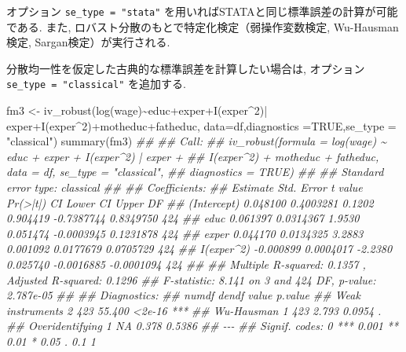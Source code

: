 \documentclass[
  letterpaper,
  xelatex,
  ja=standard, xelatex]{bxjsbook}
\newenvironment{Shaded}{\begin{snugshade}}{\end{snugshade}}
\newcommand{\AttributeTok}[1]{\textcolor[rgb]{0.40,0.45,0.13}{#1}}
\newcommand{\ConstantTok}[1]{\textcolor[rgb]{0.56,0.35,0.01}{#1}}
\newcommand{\DecValTok}[1]{\textcolor[rgb]{0.68,0.00,0.00}{#1}}
\newcommand{\DocumentationTok}[1]{\textcolor[rgb]{0.37,0.37,0.37}{\textit{#1}}}
\newcommand{\FunctionTok}[1]{\textcolor[rgb]{0.28,0.35,0.67}{#1}}
\newcommand{\NormalTok}[1]{\textcolor[rgb]{0.00,0.23,0.31}{#1}}
\newcommand{\OtherTok}[1]{\textcolor[rgb]{0.00,0.23,0.31}{#1}}
\newcommand{\SpecialCharTok}[1]{\textcolor[rgb]{0.37,0.37,0.37}{#1}}
\newcommand{\StringTok}[1]{\textcolor[rgb]{0.13,0.47,0.30}{#1}}
\begin{document}
オプション \texttt{se\_type\ =\ "stata"}
を用いればSTATAと同じ標準誤差の計算が可能である. また,
ロバスト分散のもとで特定化検定（弱操作変数検定, Wu-Hausman検定,
Sargan検定）が実行される.

分散均一性を仮定した古典的な標準誤差を計算したい場合は, オプション
\texttt{se\_type\ =\ "classical"} を追加する.

\begin{Shaded}
\begin{Highlighting}[]
\NormalTok{fm3 }\OtherTok{\textless{}{-}} \FunctionTok{iv\_robust}\NormalTok{(}\FunctionTok{log}\NormalTok{(wage)}\SpecialCharTok{\textasciitilde{}}\NormalTok{educ}\SpecialCharTok{+}\NormalTok{exper}\SpecialCharTok{+}\FunctionTok{I}\NormalTok{(exper}\SpecialCharTok{\^{}}\DecValTok{2}\NormalTok{)}\SpecialCharTok{|}
\NormalTok{            exper}\SpecialCharTok{+}\FunctionTok{I}\NormalTok{(exper}\SpecialCharTok{\^{}}\DecValTok{2}\NormalTok{)}\SpecialCharTok{+}\NormalTok{motheduc}\SpecialCharTok{+}\NormalTok{fatheduc,}
            \AttributeTok{data=}\NormalTok{df,}\AttributeTok{diagnostics =}\ConstantTok{TRUE}\NormalTok{,}\AttributeTok{se\_type =} \StringTok{"classical"}\NormalTok{)}
\FunctionTok{summary}\NormalTok{(fm3)}
\DocumentationTok{\#\# }
\DocumentationTok{\#\# Call:}
\DocumentationTok{\#\# iv\_robust(formula = log(wage) \textasciitilde{} educ + exper + I(exper\^{}2) | exper + }
\DocumentationTok{\#\#     I(exper\^{}2) + motheduc + fatheduc, data = df, se\_type = "classical", }
\DocumentationTok{\#\#     diagnostics = TRUE)}
\DocumentationTok{\#\# }
\DocumentationTok{\#\# Standard error type:  classical }
\DocumentationTok{\#\# }
\DocumentationTok{\#\# Coefficients:}
\DocumentationTok{\#\#              Estimate Std. Error t value Pr(\textgreater{}|t|)   CI Lower   CI Upper  DF}
\DocumentationTok{\#\# (Intercept)  0.048100  0.4003281  0.1202 0.904419 {-}0.7387744  0.8349750 424}
\DocumentationTok{\#\# educ         0.061397  0.0314367  1.9530 0.051474 {-}0.0003945  0.1231878 424}
\DocumentationTok{\#\# exper        0.044170  0.0134325  3.2883 0.001092  0.0177679  0.0705729 424}
\DocumentationTok{\#\# I(exper\^{}2)  {-}0.000899  0.0004017 {-}2.2380 0.025740 {-}0.0016885 {-}0.0001094 424}
\DocumentationTok{\#\# }
\DocumentationTok{\#\# Multiple R{-}squared:  0.1357 ,    Adjusted R{-}squared:  0.1296 }
\DocumentationTok{\#\# F{-}statistic: 8.141 on 3 and 424 DF,  p{-}value: 2.787e{-}05}
\DocumentationTok{\#\# }
\DocumentationTok{\#\# Diagnostics:}
\DocumentationTok{\#\#                  numdf dendf  value p.value    }
\DocumentationTok{\#\# Weak instruments     2   423 55.400  \textless{}2e{-}16 ***}
\DocumentationTok{\#\# Wu{-}Hausman           1   423  2.793  0.0954 .  }
\DocumentationTok{\#\# Overidentifying      1    NA  0.378  0.5386    }
\DocumentationTok{\#\# {-}{-}{-}}
\DocumentationTok{\#\# Signif. codes:  0 \textquotesingle{}***\textquotesingle{} 0.001 \textquotesingle{}**\textquotesingle{} 0.01 \textquotesingle{}*\textquotesingle{} 0.05 \textquotesingle{}.\textquotesingle{} 0.1 \textquotesingle{} \textquotesingle{} 1}
\end{Highlighting}
\end{Shaded}
\end{document}
